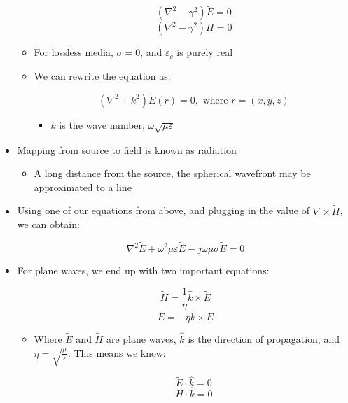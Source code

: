 \begin{itemize}
\begin{itemize}
        $$(\nabla^2-\gamma^2)\tilde{E}=0$$
        $$(\nabla^2-\gamma^2)\tilde{H}=0$$

      \item For lossless media, $\sigma=0$, and $\varepsilon_c$ is purely real

      \item We can rewrite the equation as:

        $$(\nabla^2+k^2)\tilde{E}(r)=0,\text{ where }r=(x,y,z)$$

        \begin{itemize}

          \item $k$ is the wave number, $\omega\sqrt{\mu\varepsilon}$

        \end{itemize}

    \end{itemize}

  \item Mapping from source to field is known as radiation

    \begin{itemize}

      \item A long distance from the source, the spherical wavefront may be approximated to a line

    \end{itemize}

  \item Using one of our equations from above, and plugging in the value of $\nabla\times\tilde{H}$, we can obtain:

    $$\nabla^2\tilde{E}+\omega^2\mu\varepsilon\tilde{E}-j\omega\mu\sigma\tilde{E}=0$$

  \item For plane waves, we end up with two important equations:

    $$\tilde{H}=\frac{1}{\eta}\hat{k}\times\tilde{E}$$
    $$\tilde{E}=-\eta\hat{k}\times\tilde{E}$$

    \begin{itemize}

      \item Where $\tilde{E}$ and $\tilde{H}$ are plane waves, $\hat{k}$ is the direction of propagation, and $\eta=\sqrt{\frac{\mu}{\varepsilon}}$. This means we know:

        $$\tilde{E}\cdot\hat{k}=0$$
        $$\tilde{H}\cdot\hat{k}=0$$

    \end{itemize}


\end{itemize}
